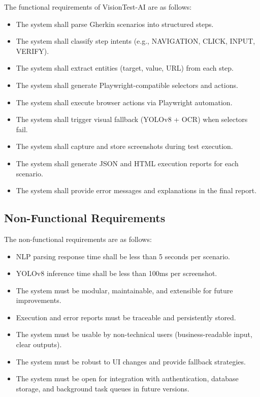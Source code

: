 The functional requirements of VisionTest-AI are as follows:
\begin{itemize}
	\item[FR1:] The system shall parse Gherkin scenarios into structured steps.
	\item[FR2:] The system shall classify step intents (e.g., NAVIGATION, CLICK, INPUT, VERIFY).
	\item[FR3:] The system shall extract entities (target, value, URL) from each step.
	\item[FR4:] The system shall generate Playwright-compatible selectors and actions.
	\item[FR5:] The system shall execute browser actions via Playwright automation.
	\item[FR6:] The system shall trigger visual fallback (YOLOv8 + OCR) when selectors fail.
	\item[FR7:] The system shall capture and store screenshots during test execution.
	\item[FR8:] The system shall generate JSON and HTML execution reports for each scenario.
	\item[FR9:] The system shall provide error messages and explanations in the final report.
\end{itemize}

\subsection{Non-Functional Requirements}
\label{subsec:non_functional_requirements_ch1}


The non-functional requirements are as follows:
\begin{itemize}
	\item[NFR1:] NLP parsing response time shall be less than 5 seconds per scenario.
	\item[NFR2:] YOLOv8 inference time shall be less than 100ms per screenshot.
	\item[NFR3:] The system must be modular, maintainable, and extensible for future improvements.
	\item[NFR4:] Execution and error reports must be traceable and persistently stored.
	\item[NFR5:] The system must be usable by non-technical users (business-readable input, clear outputs).
	\item[NFR6:] The system must be robust to UI changes and provide fallback strategies.
	\item[NFR7:] The system must be open for integration with authentication, database storage, and background task queues in future versions.
\end{itemize}


